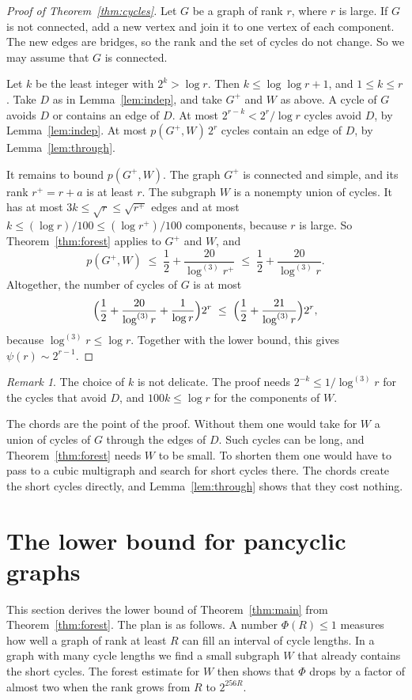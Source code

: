 \documentclass[11pt]{article}
\theoremstyle{definition}
\theoremstyle{remark}
\newtheorem{remark}[theorem]{Remark}
\newcommand{\lgk}[1]{\log^{(#1)}}
\numberwithin{equation}{section}
\begin{document}
\begin{proof}[Proof of Theorem~\ref{thm:cycles}]
Let $G$ be a graph of rank $r$, where $r$ is large. If $G$ is not connected, add a new vertex and
join it to one vertex of each component. The new edges are bridges, so the rank and the set of
cycles do not change. So we may assume that $G$ is connected.

Let $k$ be the least integer with $2^{k}>\log r$. Then $k\le\log\log r+1$, and $1\le k\le r$. Take
$D$ as in Lemma~\ref{lem:indep}, and take $G^{+}$ and $W$ as above. A cycle of $G$ avoids $D$ or
contains an edge of $D$. At most $2^{r-k}<2^{r}/\log r$ cycles avoid $D$, by
Lemma~\ref{lem:indep}. At most $p(G^{+},W)\,2^{r}$ cycles contain an edge of $D$, by
Lemma~\ref{lem:through}.

It remains to bound $p(G^{+},W)$. The graph $G^{+}$ is connected and simple, and its rank
$r^{+}=r+a$ is at least $r$. The subgraph $W$ is a nonempty union of cycles. It has at most
$3k\le\sqrt{r}\le\sqrt{r^{+}}$ edges and at most $k\le(\log r)/100\le(\log r^{+})/100$ components,
because $r$ is large. So Theorem~\ref{thm:forest} applies to $G^{+}$ and $W$, and
\[
  p(G^{+},W)\;\le\;\frac12+\frac{20}{\lgk3r^{+}}\;\le\;\frac12+\frac{20}{\lgk3r}.
\]
Altogether, the number of cycles of $G$ is at most
\[
  \Bigl(\frac12+\frac{20}{\lgk3r}+\frac1{\log r}\Bigr)2^{r}
  \;\le\;\Bigl(\frac12+\frac{21}{\lgk3r}\Bigr)2^{r},
\]
because $\lgk3r\le\log r$. Together with the lower bound, this gives $\psi(r)\sim2^{r-1}$.
\end{proof}

\begin{remark}\label{rem:chords}
The choice of $k$ is not delicate. The proof needs $2^{-k}\le1/\lgk3r$ for the cycles that avoid
$D$, and $100k\le\log r$ for the components of $W$.

The chords are the point of the proof. Without them one would take for $W$ a union of cycles of $G$
through the edges of $D$. Such cycles can be long, and Theorem~\ref{thm:forest} needs $W$ to be
small. To shorten them one would have to pass to a cubic multigraph and search for short cycles
there. The chords create the short cycles directly, and Lemma~\ref{lem:through} shows that they cost
nothing.
\end{remark}
\section{The lower bound for pancyclic graphs}\label{sec:lower}

This section derives the lower bound of Theorem~\ref{thm:main} from Theorem~\ref{thm:forest}. The
plan is as follows. A number $\Phi(R)\le1$ measures how well a graph of rank at least $R$ can fill
an interval of cycle lengths. In a graph with many cycle lengths we find a small subgraph $W$ that
already contains the short cycles. The forest estimate for $W$ then shows that $\Phi$ drops by a
factor of almost two when the rank grows from $R$ to $2^{256R}$.
\end{document}
